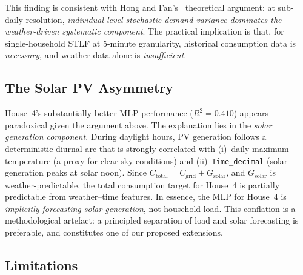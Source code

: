 \documentclass[12pt,a4paper]{article}
\begin{document}
This finding is consistent with Hong and Fan's~\cite{hong2016} theoretical
argument: at sub-daily resolution, \emph{individual-level stochastic demand
variance dominates the weather-driven systematic component}. The practical
implication is that, for single-household STLF at 5-minute granularity,
historical consumption data is \emph{necessary}, and weather data alone is
\emph{insufficient}.

\subsection{The Solar PV Asymmetry}
\label{subsec:solar}

House~4's substantially better MLP performance ($R^2 = 0.410$) appears
paradoxical given the argument above. The explanation lies in the \emph{solar
generation component}. During daylight hours, PV generation follows a
deterministic diurnal arc that is strongly correlated with (i)~daily maximum
temperature (a proxy for clear-sky conditions) and (ii)~\texttt{Time\_decimal}
(solar generation peaks at solar noon). Since $C_{\text{total}} =
C_{\text{grid}} + G_{\text{solar}}$, and $G_{\text{solar}}$ is
weather-predictable, the total consumption target for House~4 is partially
predictable from weather--time features. In essence, the MLP for House~4 is
\emph{implicitly forecasting solar generation}, not household load. This
conflation is a methodological artefact: a principled separation of load and
solar forecasting is preferable, and constitutes one of our proposed
extensions.

\subsection{Limitations}
\end{document}
